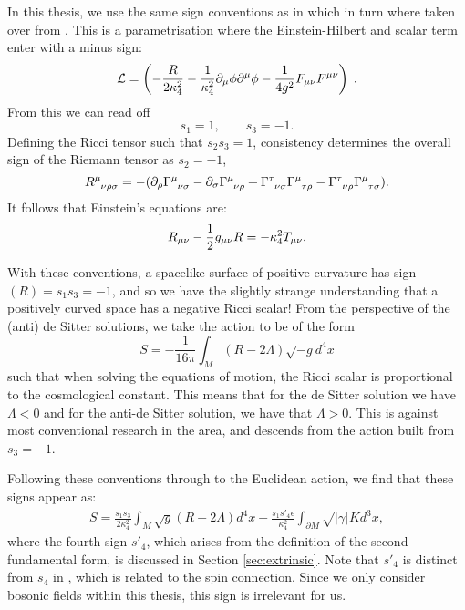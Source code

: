 In this thesis, we use the same sign conventions as in 
\cite{Gutowski:2019iyo, Gutowski:2020fzb} which in turn where taken over from \cite{Dempster:2015}. This is a parametrisation where the Einstein-Hilbert and
scalar term enter with a minus sign:
\begin{equation*}
	{\cal L} = \left(-\frac{R}{2 \kappa_4^2} - \frac{1}{\kappa_4^2} \partial_\mu \phi \partial^\mu \phi  - \frac{1}{4 g^2} F_{\mu \nu} F^{\mu \nu} \right)\;.
\end{equation*} 
From this we can read off 
\begin{equation*}
	s_1 = 1, \qquad s_3 = -1.
\end{equation*}
Defining the Ricci tensor such that  $s_2 s_3=1$, consistency determines the overall sign of the Riemann tensor as 
$s_2 = -1$, 
\begin{equation*}
	\tensor{R}{^\mu_{\nu \rho \sigma}} = -(\partial_\rho \tensor{\Gamma}{^\mu_{\nu \sigma}} - \partial_\sigma \tensor{\Gamma}{^\mu_{\nu \rho}} +  \tensor{\Gamma}{^\tau_{\nu \sigma}} \tensor{\Gamma}{^\mu_{\tau \rho}} -  \tensor{\Gamma}{^\tau_{\nu \rho}} \tensor{\Gamma}{^\mu_{\tau \sigma}} ).
\end{equation*} 
It follows that Einstein's equations are:
\begin{equation*}
	 R_{\mu \nu} - \frac{1}{2} g_{\mu \nu} R =  -\kappa_4^2 T_{\mu \nu}.
\end{equation*}

With these conventions, a spacelike surface of positive curvature has sign$(R) = s_1 s_3 = -1$, and so we have the slightly strange understanding that a positively curved space has a negative Ricci scalar! From the perspective of the (anti) de Sitter solutions, we take the action to be of the form
\begin{equation*}
	S = - \frac{1}{16\pi} \int_{M} (R - 2\Lambda) \sqrt{-g} d^4 x
\end{equation*}
such that when solving the equations of motion, the Ricci scalar is proportional to the cosmological constant. This means that for the de Sitter solution we have $\Lambda < 0$ and for the anti-de Sitter solution, we have that $\Lambda > 0$. This is against most conventional research in the area, and descends from the action built from $s_3 = -1$.

Following these conventions through to the Euclidean action, we find that these signs appear as:
\begin{equation}
\label{eq:totact}	
\begin{aligned}
		S = \frac{s_1 s_3}{2\kappa_4^2} \int_M \sqrt{g} (R - 2\Lambda) d^4 x + \frac{s_1 s'_4 \epsilon}{\kappa_4^2} \int_{\partial M} \sqrt{|\gamma|} K d^3x ,
\end{aligned}
\end{equation}
where the fourth sign $s'_4$, which arises from the definition of the second fundamental form, is discussed in Section \ref{sec:extrinsic}. Note that $s'_4$ is distinct from $s_4$ in \cite{Freedman:2012zz}, which is related to the spin connection. Since we only consider bosonic fields within this thesis, this sign is irrelevant for us. 




